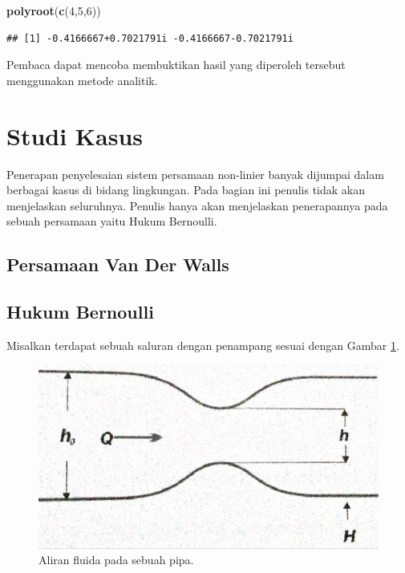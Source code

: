 \documentclass[]{book}
\newenvironment{Shaded}{\begin{snugshade}}{\end{snugshade}}
\newcommand{\DecValTok}[1]{\textcolor[rgb]{0.00,0.00,0.81}{#1}}
\newcommand{\KeywordTok}[1]{\textcolor[rgb]{0.13,0.29,0.53}{\textbf{#1}}}
\newcommand{\NormalTok}[1]{#1}
\theoremstyle{definition}
\theoremstyle{definition}
\theoremstyle{definition}
\theoremstyle{remark}
\begin{document}
\begin{Shaded}
\begin{Highlighting}[]
\KeywordTok{polyroot}\NormalTok{(}\KeywordTok{c}\NormalTok{(}\DecValTok{4}\NormalTok{,}\DecValTok{5}\NormalTok{,}\DecValTok{6}\NormalTok{))}
\end{Highlighting}
\end{Shaded}

\begin{verbatim}
## [1] -0.4166667+0.7021791i -0.4166667-0.7021791i
\end{verbatim}

Pembaca dapat mencoba membuktikan hasil yang diperoleh tersebut menggunakan metode analitik.

\hypertarget{studi-kasus}{%
\section{Studi Kasus}\label{studi-kasus}}

Penerapan penyelesaian sistem persamaan non-linier banyak dijumpai dalam berbagai kasus di bidang lingkungan. Pada bagian ini penulis tidak akan menjelaskan seluruhnya. Penulis hanya akan menjelaskan penerapannya pada sebuah persamaan yaitu Hukum Bernoulli.

\hypertarget{persamaan-van-der-walls}{%
\subsection{Persamaan Van Der Walls}\label{persamaan-van-der-walls}}

\hypertarget{hukum-bernoulli}{%
\subsection{Hukum Bernoulli}\label{hukum-bernoulli}}

Misalkan terdapat sebuah saluran dengan penampang sesuai dengan Gambar \ref{fig:bernoulli}.

\begin{figure}

{\centering \includegraphics[width=0.8\linewidth]{./images/bernoulli} 

}

\caption{Aliran fluida pada sebuah pipa.}\label{fig:bernoulli}
\end{figure}
\end{document}
